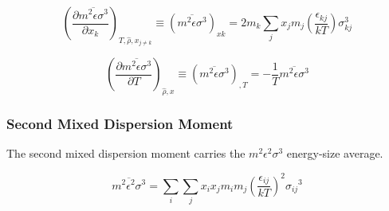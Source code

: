 \documentclass[12pt, letterpaper]{article}
\begin{document}

\begin{equation}
    \left(\frac{\partial\overline{m^{2}\epsilon\sigma^{3}}}{\partial x_{k}}\right)_{T,\hat{\rho},x_{j\neq k}}
    \equiv \left(\overline{m^{2}\epsilon\sigma^{3}}\right)_{xk}
    =2m_{k}\sum_{j}x_{j}m_{j}\left(\frac{\epsilon_{kj}}{kT}\right)\sigma_{kj}^{3}
    \label{eq:m2epssigma3_xk}
\end{equation}


\begin{equation}
    \left(\frac{\partial\overline{m^{2}\epsilon\sigma^{3}}}{\partial T}\right)_{\hat{\rho},x}
    \equiv \left(\overline{m^{2}\epsilon\sigma^{3}}\right)_{,T}
    =-\frac{1}{T}\overline{m^{2}\epsilon\sigma^{3}}
    \label{eq:m2epssigma3_dT}
\end{equation}

\subsubsection{Second Mixed Dispersion Moment}

The second mixed dispersion moment carries the \(m^2\epsilon^2\sigma^3\) energy-size average.

\begin{equation}
    \overline{m^2 \epsilon^2 \sigma^3}=\sum_{i} \sum_{j} x_{i} x_{j} m_{i} m_{j}\left(\frac{\epsilon_{i j}}{k T}\right)^2 \sigma_{i j}{ }^3
    \label{eq:m2eps2sigma3_bar}
\end{equation}

\end{document}
